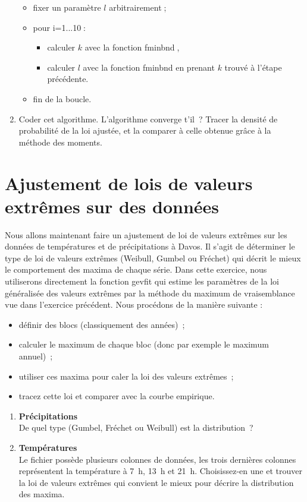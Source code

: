 \documentclass[a4paper]{article}
\begin{document}
\begin{enumerate}
\begin{itemize}
 \item fixer un paramètre $l$ arbitrairement$\;$;
 \item pour i=1...10$\;$:
 \begin{itemize}
  \item calculer $k$ avec la fonction fminbnd$\;$,
  \item calculer $l$ avec la fonction fminbnd en prenant $k$ trouvé à l'étape précédente.
 \end{itemize}
\item fin de la boucle.
\end{itemize}


\item Coder cet algorithme. L'algorithme converge t'il~? Tracer la densité de probabilité de la loi ajustée, et la comparer à celle obtenue grâce à la méthode des moments.

\end{enumerate}

\section{Ajustement de lois de valeurs extrêmes sur des données}

Nous allons maintenant faire un ajustement de loi de valeurs extrêmes sur les données de températures et de précipitations à Davos. Il s'agit de déterminer le type de loi de valeurs extrêmes (Weibull, Gumbel ou Fréchet) qui décrit le mieux le comportement des maxima de chaque série. Dans cette exercice, nous utiliserons directement la fonction gevfit qui estime les paramètres de la loi généralisée des valeurs extrêmes par la méthode du maximum de vraisemblance vue dans l'exercice précédent.
 Nous procédons de la manière suivante :\\
  \begin{itemize}
    \item définir des blocs (classiquement des années)~;
    \item calculer le maximum de chaque bloc (donc par exemple le maximum annuel)~;
    \item utiliser ces maxima pour caler la loi des valeurs extrêmes~;
    \item tracez cette loi et comparer avec la courbe empirique.
  \end{itemize}
  \begin{enumerate}
  \item \textbf{Précipitations} \\
De quel type (Gumbel, Fréchet ou Weibull) est la distribution~?\\
  \item \textbf{Températures} \\
Le fichier possède plusieurs colonnes de données, les trois dernières colonnes représentent la température à 7~h, 13~h et 21~h. Choisissez-en une et trouver la loi de valeurs extrêmes qui convient le mieux pour décrire la distribution des maxima.
  \end{enumerate}
\end{document}
